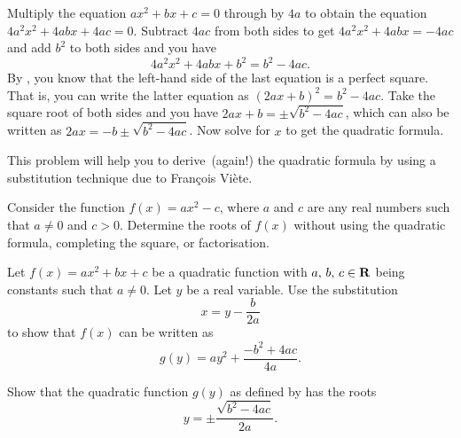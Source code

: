 \documentclass[a4paper,oneside,12pt]{article}
\begin{document}
\begin{problem}
{\begin{solution}
Multiply the equation $ax^2 + bx + c = 0$ through by $4a$ to obtain
the equation $4a^2x^2 + 4abx + 4ac = 0$.  Subtract $4ac$ from both
sides to get $4a^2x^2 + 4abx = -4ac$ and add $b^2$ to both sides and
you have
\[
4a^2x^2 + 4abx + b^2
=
b^2 - 4ac.
\]
By , you
know that the left-hand side of the last equation is a perfect
square.  That is, you can write the latter equation as
$(2ax + b)^2 = b^2 - 4ac$.  Take the square root of both sides and you
have $2ax + b = \pm \sqrt{b^2 - 4ac}$, which can also be written as
$2ax = -b \pm \sqrt{b^2 - 4ac}$.  Now solve for $x$ to get the
quadratic formula.
\end{solution}
}{}

\item This problem will help you to derive~(again!) the quadratic
  formula by using a substitution technique due to Fran\c{c}ois
  Vi\`ete.
  \begin{packedenum}
  \item\label{subprob:quadratic_roots:Viete_ax_square_minus_c}
    Consider the function $f(x) = ax^2 - c$, where $a$ and $c$ are any
    real numbers such that $a \neq 0$ and $c > 0$.  Determine the
    roots of $f(x)$ without using the quadratic formula, completing
    the square, or factorisation.

  \item\label{subprob:quadratic_roots:Viete_substitution}
    Let $f(x) = ax^2 + bx + c$ be a quadratic function with
    ${a},\, {b},\, {c} \in \mathbf{R}$ being constants such that $a \neq 0$.
    Let $y$ be a real variable.  Use the substitution
    \begin{equation}
    \label{eqn:quadratic_roots:Viete_substitution}
    x
    =
    y - \frac{b}{2a}
    \end{equation}
    to show that $f(x)$ can be written as
    \begin{equation}
    \label{eqn:quadratic_roots:Viete_substitution_expand}
    g(y)
    =
    ay^2
    +
    \frac{-b^2 + 4ac}{4a}.
    \end{equation}

  \item\label{subprob:quadratic_roots:Viete_quadratic_formula}
    Show that the quadratic function $g(y)$ as defined by
     has the
    roots
    \begin{equation}
    \label{eqn:quadratic_roots:Viete_quadratic_formula}
    y
    =
    \pm
    \frac{
      \sqrt{b^2 - 4ac}
    }{
      2a
    }.
    \end{equation}


\end{packedenum}
\end{problem}
\end{document}
